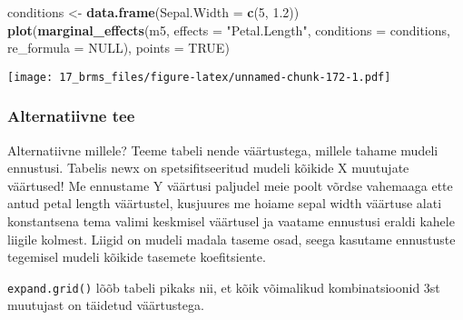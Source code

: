 \documentclass[]{article}
\newenvironment{Shaded}{\begin{snugshade}}{\end{snugshade}}
\newcommand{\KeywordTok}[1]{\textcolor[rgb]{0.13,0.29,0.53}{\textbf{#1}}}
\newcommand{\DataTypeTok}[1]{\textcolor[rgb]{0.13,0.29,0.53}{#1}}
\newcommand{\DecValTok}[1]{\textcolor[rgb]{0.00,0.00,0.81}{#1}}
\newcommand{\FloatTok}[1]{\textcolor[rgb]{0.00,0.00,0.81}{#1}}
\newcommand{\StringTok}[1]{\textcolor[rgb]{0.31,0.60,0.02}{#1}}
\newcommand{\OtherTok}[1]{\textcolor[rgb]{0.56,0.35,0.01}{#1}}
\newcommand{\OperatorTok}[1]{\textcolor[rgb]{0.81,0.36,0.00}{\textbf{#1}}}
\newcommand{\NormalTok}[1]{#1}
\begin{document}
\begin{Shaded}
\begin{Highlighting}[]
\NormalTok{conditions <-}\StringTok{ }\KeywordTok{data.frame}\NormalTok{(}\DataTypeTok{Sepal.Width =} \KeywordTok{c}\NormalTok{(}\DecValTok{5}\NormalTok{, }\FloatTok{1.2}\NormalTok{))}
\KeywordTok{plot}\NormalTok{(}\KeywordTok{marginal_effects}\NormalTok{(m5, }\DataTypeTok{effects =} \StringTok{"Petal.Length"}\NormalTok{, }\DataTypeTok{conditions =}\NormalTok{ conditions, }\DataTypeTok{re_formula =} \OtherTok{NULL}\NormalTok{), }\DataTypeTok{points =} \OtherTok{TRUE}\NormalTok{)}
\end{Highlighting}
\end{Shaded}

\texttt{[image: 17\_brms\_files/figure-latex/unnamed-chunk-172-1.pdf]}

\subsubsection{Alternatiivne tee}\label{alternatiivne-tee}

Alternatiivne millele? Teeme tabeli nende väärtustega, millele tahame
mudeli ennustusi. Tabelis newx on spetsifitseeritud mudeli kõikide X
muutujate väärtused! Me ennustame Y väärtusi paljudel meie poolt võrdse
vahemaaga ette antud petal length väärtustel, kusjuures me hoiame sepal
width väärtuse alati konstantsena tema valimi keskmisel väärtusel ja
vaatame ennustusi eraldi kahele liigile kolmest. Liigid on mudeli madala
taseme osad, seega kasutame ennustuste tegemisel mudeli kõikide tasemete
koefitsiente.

\begin{Shaded}
\end{Shaded}

\texttt{expand.grid()} lõõb tabeli pikaks nii, et kõik võimalikud
kombinatsioonid 3st muutujast on täidetud väärtustega.
\end{document}
